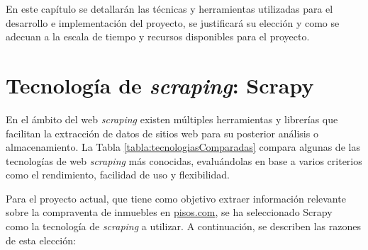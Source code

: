 
En este capítulo se detallarán las técnicas y herramientas utilizadas para el desarrollo e implementación del proyecto, se justificará su elección y como se adecuan a la escala de tiempo y recursos disponibles para el proyecto.

\section{Tecnología de \textit{scraping}: Scrapy}\label{sec:scrapy_section}


En el ámbito del web \textit{scraping} existen múltiples herramientas y librerías que facilitan la extracción de datos de sitios web para su posterior análisis o almacenamiento. La Tabla    \ref{tabla:tecnologiasComparadas} compara algunas de las tecnologías de web \textit{scraping} más conocidas, evaluándolas en base a varios criterios como el rendimiento, facilidad de uso y flexibilidad.

Para el proyecto actual, que tiene como objetivo extraer información relevante sobre la compraventa de inmuebles en \url{pisos.com}, se ha seleccionado Scrapy~\cite{scrapy} como la tecnología de \textit{scraping} a utilizar. A continuación, se describen las razones de esta elección:

